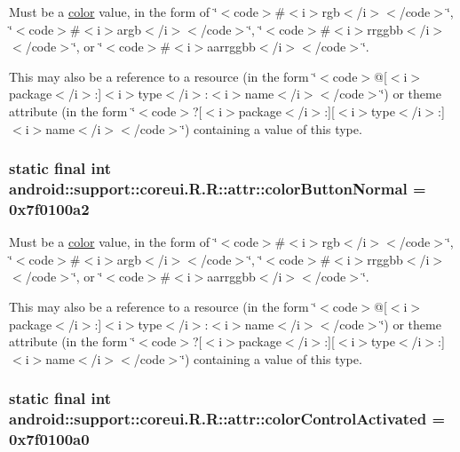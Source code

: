 Must be a \hyperlink{classandroid_1_1support_1_1coreui_1_1_r_1_1color}{color} value, in the form of \char`\"{}$<$code$>$\#$<$i$>$rgb$<$/i$>$$<$/code$>$\char`\"{}, \char`\"{}$<$code$>$\#$<$i$>$argb$<$/i$>$$<$/code$>$\char`\"{}, \char`\"{}$<$code$>$\#$<$i$>$rrggbb$<$/i$>$$<$/code$>$\char`\"{}, or \char`\"{}$<$code$>$\#$<$i$>$aarrggbb$<$/i$>$$<$/code$>$\char`\"{}. 

This may also be a reference to a resource (in the form \char`\"{}$<$code$>$@\mbox{[}$<$i$>$package$<$/i$>$:\mbox{]}$<$i$>$type$<$/i$>$:$<$i$>$name$<$/i$>$$<$/code$>$\char`\"{}) or theme attribute (in the form \char`\"{}$<$code$>$?\mbox{[}$<$i$>$package$<$/i$>$:\mbox{]}\mbox{[}$<$i$>$type$<$/i$>$:\mbox{]}$<$i$>$name$<$/i$>$$<$/code$>$\char`\"{}) containing a value of this type. \hypertarget{classandroid_1_1support_1_1coreui_1_1_r_1_1attr_7b2694dbb1e3f2fc6f09cc361455562d}{
\subsubsection[{colorButtonNormal}]{\setlength{\rightskip}{0pt plus 5cm}static final int android::support::coreui.R.R::attr::colorButtonNormal = 0x7f0100a2}}
\label{classandroid_1_1support_1_1coreui_1_1_r_1_1attr_7b2694dbb1e3f2fc6f09cc361455562d}


Must be a \hyperlink{classandroid_1_1support_1_1coreui_1_1_r_1_1color}{color} value, in the form of \char`\"{}$<$code$>$\#$<$i$>$rgb$<$/i$>$$<$/code$>$\char`\"{}, \char`\"{}$<$code$>$\#$<$i$>$argb$<$/i$>$$<$/code$>$\char`\"{}, \char`\"{}$<$code$>$\#$<$i$>$rrggbb$<$/i$>$$<$/code$>$\char`\"{}, or \char`\"{}$<$code$>$\#$<$i$>$aarrggbb$<$/i$>$$<$/code$>$\char`\"{}. 

This may also be a reference to a resource (in the form \char`\"{}$<$code$>$@\mbox{[}$<$i$>$package$<$/i$>$:\mbox{]}$<$i$>$type$<$/i$>$:$<$i$>$name$<$/i$>$$<$/code$>$\char`\"{}) or theme attribute (in the form \char`\"{}$<$code$>$?\mbox{[}$<$i$>$package$<$/i$>$:\mbox{]}\mbox{[}$<$i$>$type$<$/i$>$:\mbox{]}$<$i$>$name$<$/i$>$$<$/code$>$\char`\"{}) containing a value of this type. \hypertarget{classandroid_1_1support_1_1coreui_1_1_r_1_1attr_d01a4b1a9ce3beb7d1869616e9505fcd}{
\subsubsection[{colorControlActivated}]{\setlength{\rightskip}{0pt plus 5cm}static final int android::support::coreui.R.R::attr::colorControlActivated = 0x7f0100a0}}
\label{classandroid_1_1support_1_1coreui_1_1_r_1_1attr_d01a4b1a9ce3beb7d1869616e9505fcd}



